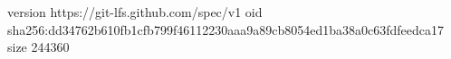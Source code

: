 version https://git-lfs.github.com/spec/v1
oid sha256:dd34762b610fb1cfb799f46112230aaa9a89cb8054ed1ba38a0c63fdfeedca17
size 244360
